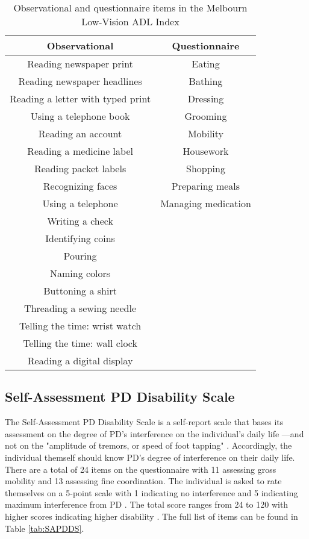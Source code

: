 \begin{table}[ht]
    \centering
    \caption{Observational and questionnaire items in the Melbourn Low-Vision ADL Index \cite{haymes_development_2001}}
    \label{tab:MLVAI}
    \begin{tabular}{ c c }
        \hline
        \textbf{Observational} & \textbf{Questionnaire} \\
        \hline
        Reading newspaper print & Eating \\
        Reading newspaper headlines & Bathing \\
        Reading a letter with typed print & Dressing \\ 
        Using a telephone book & Grooming \\
        Reading an account & Mobility \\
        Reading a medicine label & Housework \\
        Reading packet labels & Shopping \\
        Recognizing faces & Preparing meals \\
        Using a telephone & Managing medication \\
        Writing a check & \\
        Identifying coins & \\
        Pouring & \\
        Naming colors & \\
        Buttoning a shirt & \\
        Threading a sewing needle & \\
        Telling the time: wrist watch & \\
        Telling the time: wall clock & \\
        Reading a digital display & \\
        \hline
    \end{tabular}
\end{table}

\subsection{Self-Assessment PD Disability Scale} 
The Self-Assessment PD Disability Scale is a self-report scale that bases its assessment on the degree of PD's interference on the individual's daily life \cite{brown_accuracy_1989}---and not on the "amplitude of tremors, or speed of foot tapping" \cite{brown_accuracy_1989}. Accordingly, the individual themself should know PD's degree of interference on their daily life. There are a total of 24 items on the questionnaire with 11 assessing gross mobility and 13 assessing fine coordination. The individual is asked to rate themselves on a 5-point scale with 1 indicating no interference and 5 indicating maximum interference from PD \cite{brown_accuracy_1989}. The total score ranges from 24 to 120 with higher scores indicating higher disability \cite{brown_accuracy_1989}. The full list of items can be found in Table \ref{tab:SAPDDS}.


